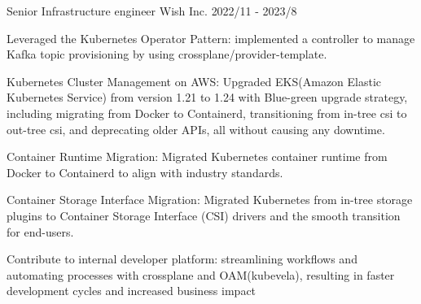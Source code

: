 

\begin{cventries}

\cventry
  {Senior Infrastructure engineer} %
  {Wish Inc.} %
  {} %
  {2022/11 - 2023/8} %
  {
    \begin{cvitems} %
      \item {Leveraged the Kubernetes Operator Pattern: implemented a controller to manage Kafka topic provisioning by using crossplane/provider-template.}
      \item {Kubernetes Cluster Management on AWS: Upgraded EKS(Amazon Elastic Kubernetes Service) from version 1.21 to 1.24 with Blue-green upgrade strategy, including migrating from Docker to Containerd, transitioning from in-tree csi to out-tree csi, and deprecating older APIs, all without causing any downtime.}
      \item {Container Runtime Migration: Migrated Kubernetes container runtime from Docker to Containerd to align with industry standards.}
      \item {Container Storage Interface Migration: Migrated Kubernetes from in-tree storage plugins to Container Storage Interface (CSI) drivers and the smooth transition for end-users. }
      \item {Contribute to internal developer platform: streamlining workflows and automating processes with crossplane and OAM(kubevela), resulting in faster development cycles and increased business impact}
    \end{cvitems}
  }


\end{cventries}
